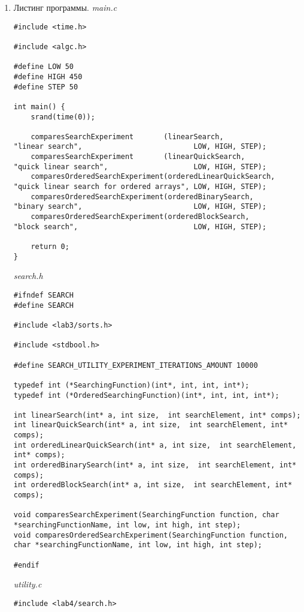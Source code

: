 \documentclass[a4paper,14pt]{extarticle}
\begin{document}
\begin{enumerate}
	\item Листинг программы.
	      \textit{main.c}
	      \begin{verbatim}
#include <time.h>

#include <algc.h>

#define LOW 50
#define HIGH 450
#define STEP 50

int main() {
    srand(time(0));

    comparesSearchExperiment       (linearSearch,             "linear search",                          LOW, HIGH, STEP);
    comparesSearchExperiment       (linearQuickSearch,        "quick linear search",                    LOW, HIGH, STEP);
    comparesOrderedSearchExperiment(orderedLinearQuickSearch, "quick linear search for ordered arrays", LOW, HIGH, STEP);
    comparesOrderedSearchExperiment(orderedBinarySearch,      "binary search",                          LOW, HIGH, STEP);
    comparesOrderedSearchExperiment(orderedBlockSearch,       "block search",                           LOW, HIGH, STEP);

    return 0;
}
	\end{verbatim}
	      \textit{search.h}
	      \begin{verbatim}
#ifndef SEARCH
#define SEARCH

#include <lab3/sorts.h>

#include <stdbool.h>

#define SEARCH_UTILITY_EXPERIMENT_ITERATIONS_AMOUNT 10000

typedef int (*SearchingFunction)(int*, int, int, int*);
typedef int (*OrderedSearchingFunction)(int*, int, int, int*);

int linearSearch(int* a, int size,  int searchElement, int* comps);
int linearQuickSearch(int* a, int size,  int searchElement, int* comps);
int orderedLinearQuickSearch(int* a, int size,  int searchElement, int* comps);
int orderedBinarySearch(int* a, int size,  int searchElement, int* comps);
int orderedBlockSearch(int* a, int size,  int searchElement, int* comps);

void comparesSearchExperiment(SearchingFunction function, char *searchingFunctionName, int low, int high, int step);
void comparesOrderedSearchExperiment(SearchingFunction function, char *searchingFunctionName, int low, int high, int step);

#endif
	\end{verbatim}
	      \textit{utility.c}
	      \begin{verbatim}
#include <lab4/search.h>


\end{verbatim}
\end{enumerate}
\end{document}
